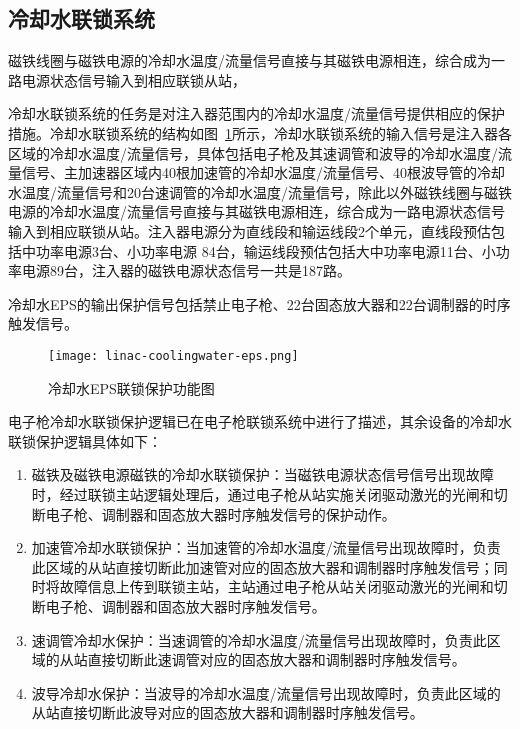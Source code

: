 \subsection{冷却水联锁系统}


磁铁线圈与磁铁电源的冷却水温度/流量信号直接与其磁铁电源相连，综合成为一路电源状态信号输入到相应联锁从站，


冷却水联锁系统的任务是对注入器范围内的冷却水温度/流量信号提供相应的保护措施。冷却水联锁系统的结构如图~\ref{fig:linac-coolingwater-eps}所示，冷却水联锁系统的输入信号是注入器各区域的冷却水温度/流量信号，具体包括电子枪及其速调管和波导的冷却水温度/流量信号、主加速器区域内40根加速管的冷却水温度/流量信号、40根波导管的冷却水温度/流量信号和20台速调管的冷却水温度/流量信号，除此以外磁铁线圈与磁铁电源的冷却水温度/流量信号直接与其磁铁电源相连，综合成为一路电源状态信号输入到相应联锁从站。注入器电源分为直线段和输运线段2个单元，直线段预估包括中功率电源3台、小功率电源 84台，输运线段预估包括大中功率电源11台、小功率电源89台，注入器的磁铁电源状态信号一共是187路\cite{sun2018}。


冷却水EPS的输出保护信号包括禁止电子枪、22台固态放大器和22台调制器的时序触发信号。

\begin{figure}[!htb]
	\centering
	\texttt{[image: linac-coolingwater-eps.png]}
	\caption{冷却水EPS联锁保护功能图}
	\label{fig:linac-coolingwater-eps}
\end{figure}

电子枪冷却水联锁保护逻辑已在电子枪联锁系统中进行了描述，其余设备的冷却水联锁保护逻辑具体如下：

\begin{enumerate}

  \item 磁铁及磁铁电源磁铁的冷却水联锁保护：当磁铁电源状态信号信号出现故障时，经过联锁主站逻辑处理后，通过电子枪从站实施关闭驱动激光的光闸和切断电子枪、调制器和固态放大器时序触发信号的保护动作。

  \item 加速管冷却水联锁保护：当加速管的冷却水温度/流量信号出现故障时，负责此区域的从站直接切断此加速管对应的固态放大器和调制器时序触发信号；同时将故障信息上传到联锁主站，主站通过电子枪从站关闭驱动激光的光闸和切断电子枪、调制器和固态放大器时序触发信号。

  \item 速调管冷却水保护：当速调管的冷却水温度/流量信号出现故障时，负责此区域的从站直接切断此速调管对应的固态放大器和调制器时序触发信号。

  \item 波导冷却水保护：当波导的冷却水温度/流量信号出现故障时，负责此区域的从站直接切断此波导对应的固态放大器和调制器时序触发信号。

\end{enumerate}

